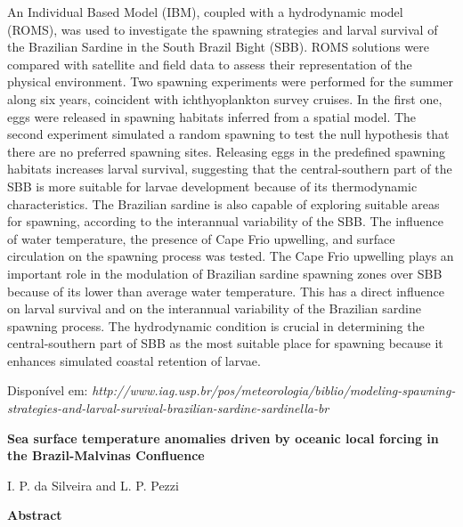 \noindent An Individual Based Model (IBM), coupled with a hydrodynamic model (ROMS), was used to investigate the spawning strategies and larval survival of the Brazilian Sardine in the South Brazil Bight (SBB). ROMS solutions were compared with satellite and field data to assess their representation of the physical environment. Two spawning experiments were performed for the summer along six years, coincident with ichthyoplankton survey cruises. In the first one, eggs were released in spawning habitats inferred from a spatial model. The second experiment simulated a random spawning to test the null hypothesis that there are no preferred spawning sites. Releasing eggs in the predefined spawning habitats increases larval survival, suggesting that the central-southern part of the SBB is more suitable for larvae development because of its thermodynamic characteristics. The Brazilian sardine is also capable of exploring suitable areas for spawning, according to the interannual variability of the SBB. The influence of water temperature, the presence of Cape Frio upwelling, and surface circulation on the spawning process was tested. The Cape Frio upwelling plays an important role in the modulation of Brazilian sardine spawning zones over SBB because of its lower than average water temperature. This has a direct influence on larval survival and on the interannual variability of the Brazilian sardine spawning process. The hydrodynamic condition is crucial in determining the central-southern part of SBB as the most suitable place for spawning because it enhances simulated coastal retention of larvae.
\bigskip

\noindent {}
\bigskip

\noindent Disponível em: \textcolor{bleu_cite}{\textit{http://www.iag.usp.br/pos/meteorologia/biblio/modeling-spawning-strategies-and-larval-survival-brazilian-sardine-sardinella-br}}
\bigskip

\newpage
\bigskip

\noindent \begin{center} \textbf{Sea surface temperature anomalies driven by oceanic local forcing in the Brazil-Malvinas Confluence}
\bigskip

\noindent I. P. da Silveira and L. P. Pezzi
\bigskip

\noindent \textbf{Abstract}\end{center}
\bigskip

